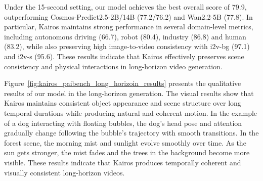 Under the 15-second setting, our model achieves the best overall score of 79.9, outperforming Cosmos-Predict2.5-2B/14B (77.2/76.2) and Wan2.2-5B (77.8). In particular, Kairos maintains strong performance in several domain-level metrics, including autonomous driving (66.7), robot (80.4), industry (86.8) and human (83.2), while also preserving high image-to-video consistency with i2v-bg (97.1) and i2v-s (95.6). These results indicate that Kairos effectively preserves scene consistency and physical interactions in long-horizon video generation.

Figure~\ref{fig:kairos_paibench_long_horizoin_results} presents the qualitative results of our model in the long-horizon generation. The visual results show that Kairos maintains consistent object appearance and scene structure over long temporal durations while producing natural and coherent motion. In the example of a dog interacting with floating bubbles, the dog’s head pose and attention gradually change following the bubble's trajectory with smooth transitions. In the forest scene, the morning mist and sunlight evolve smoothly over time. As the sun gets stronger, the mist fades and the trees in the background become more visible. These results indicate that Kairos produces temporally coherent and visually consistent long-horizon videos.




